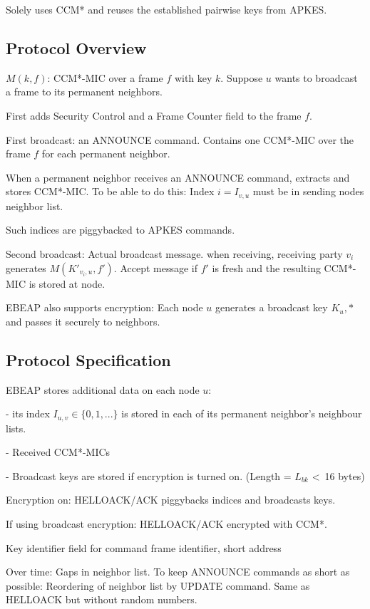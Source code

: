 \documentclass[10pt]{article}
\begin{document}
Solely uses CCM* and reuses the established pairwise keys from APKES.


\subsection{Protocol Overview}

\noindent

$M(k,f)$: CCM*-MIC over a frame $f$ with key $k$. Suppose $u$ wants to broadcast a frame to its permanent neighbors.

First adds Security Control and a Frame Counter field to the frame $f$.

First broadcast: an ANNOUNCE command. Contains one CCM*-MIC over the frame $f$ for each permanent neighbor.

When a permanent neighbor receives an ANNOUNCE command, extracts and stores CCM*-MIC. To be able to do this: Index $i=I_{v,u}$ must be in sending nodes neighbor list.

Such indices are piggybacked to APKES commands.

Second broadcast: Actual broadcast message. when receiving, receiving party $v_i$ generates $M(K'_{v_i,u}, f')$. Accept message if $f'$ is fresh and the resulting CCM*-MIC is stored at node.

EBEAP also supports encryption: Each node $u$ generates a broadcast key $K_u,*$ and passes it securely to neighbors.


\subsection{Protocol Specification}

\noindent

EBEAP stores additional data on each node $u$: 

- its index $I_{u,v} \in \{0,1, ...\}$ is stored in each of its permanent neighbor's neighbour lists.

- Received CCM*-MICs

- Broadcast keys are stored if encryption is turned on. (Length = $L_{bk}$ \textless \ 16 bytes)

Encryption on: HELLOACK/ACK piggybacks indices and broadcasts keys.

If using broadcast encryption: HELLOACK/ACK encrypted with CCM*.

Key identifier field for command frame identifier, short address

Over time: Gaps in neighbor list. To keep ANNOUNCE commands as short as possible: Reordering of neighbor list by UPDATE command. Same as HELLOACK but without random numbers.
\end{document}
